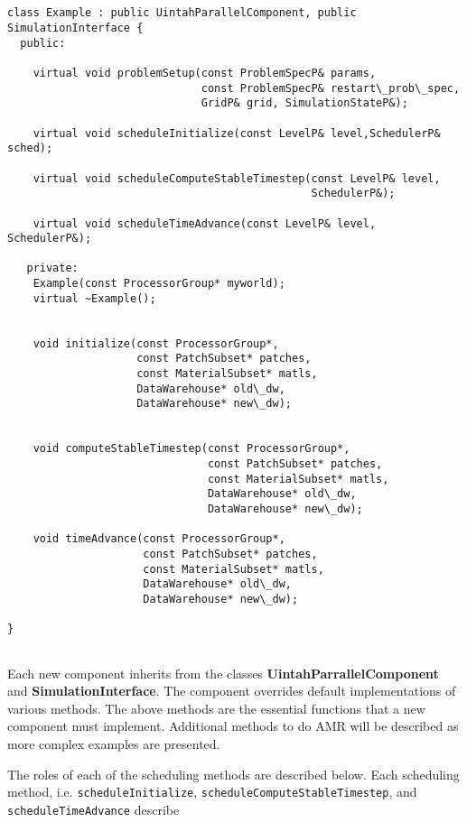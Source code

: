 \documentclass[12pt]{report}
\begin{document}
\begin{verbatim}


class Example : public UintahParallelComponent, public SimulationInterface {
  public:

    virtual void problemSetup(const ProblemSpecP& params, 
                              const ProblemSpecP& restart\_prob\_spec, 
                              GridP& grid, SimulationStateP&);

    virtual void scheduleInitialize(const LevelP& level,SchedulerP& sched);
                                    
    virtual void scheduleComputeStableTimestep(const LevelP& level, 
                                               SchedulerP&);
                                               
    virtual void scheduleTimeAdvance(const LevelP& level, SchedulerP&);

   private:
    Example(const ProcessorGroup* myworld);
    virtual ~Example();


    void initialize(const ProcessorGroup*,
                    const PatchSubset* patches, 
                    const MaterialSubset* matls,
                    DataWarehouse* old\_dw, 
                    DataWarehouse* new\_dw);
                    
                    
    void computeStableTimestep(const ProcessorGroup*,
                               const PatchSubset* patches,
                               const MaterialSubset* matls,
                               DataWarehouse* old\_dw,
                               DataWarehouse* new\_dw);
                               
    void timeAdvance(const ProcessorGroup*,
                     const PatchSubset* patches,
                     const MaterialSubset* matls,
                     DataWarehouse* old\_dw,
                     DataWarehouse* new\_dw);

}


\end{verbatim}


Each new component inherits from the classes
\textbf{UintahParrallelComponent} and \textbf{SimulationInterface}.
The component overrides default implementations of various methods.
The above methods are the essential functions that a new component
must implement.  Additional methods to do AMR will be described as
more complex examples are presented.

The roles of each of the scheduling methods are described below.  Each
scheduling method, i.e. \texttt{scheduleInitialize},
\texttt{scheduleComputeStableTimestep}, and
\texttt{scheduleTimeAdvance} describe
\end{document}
